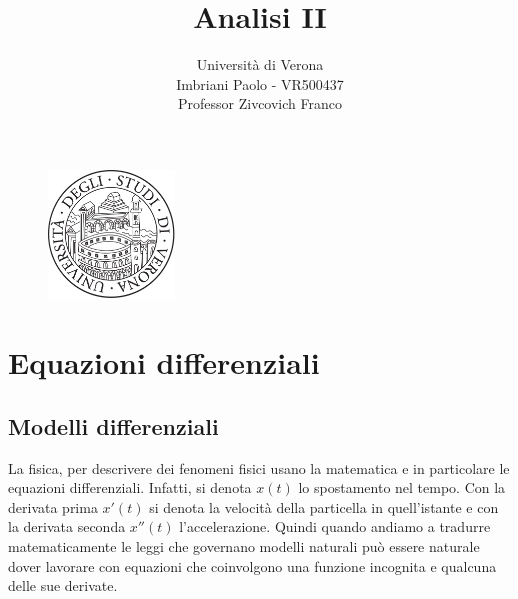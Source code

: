 \documentclass[a4paper]{article}
\title{Analisi II}
\author{Università di Verona\\Imbriani Paolo - VR500437\\Professor Zivcovich Franco}
\begin{document}
\begin{figure}
    \centering
    \includegraphics[width=0.3\textwidth]{../UniversityofVerona.png}
\end{figure}

\maketitle 

\pagebreak

\tableofcontents

\pagebreak

\section{Equazioni differenziali}

\subsection{Modelli differenziali}

La fisica, per descrivere dei fenomeni fisici usano la matematica e in particolare le equazioni differenziali. Infatti, si denota $x(t)$ lo spostamento nel tempo.
Con la derivata prima $x'(t)$ si denota la velocità della particella in quell'istante e con la derivata seconda $x''(t)$ l'accelerazione.
Quindi quando andiamo a tradurre
matematicamente le leggi che governano modelli naturali può essere naturale dover lavorare
con equazioni che coinvolgono una funzione incognita e qualcuna delle sue derivate.
\end{document}
